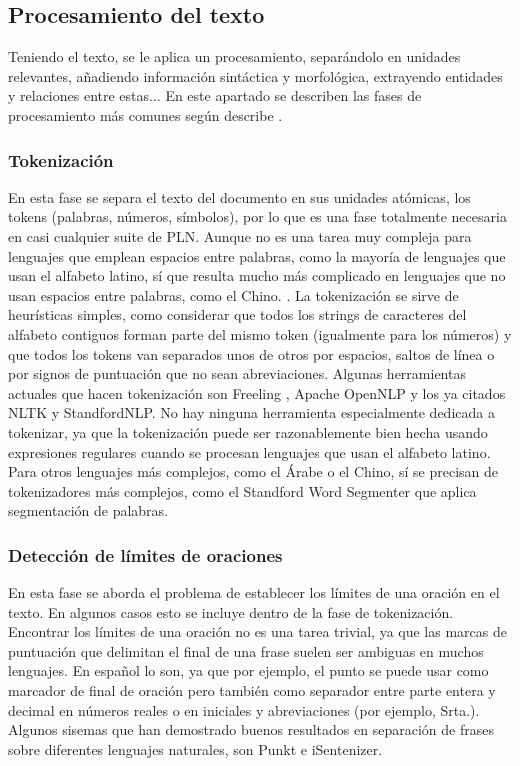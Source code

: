 \subsection{Procesamiento del texto}
Teniendo el texto, se le aplica un procesamiento, separándolo en unidades relevantes, añadiendo información sintáctica y morfológica, extrayendo entidades y relaciones entre estas... En este apartado se describen las fases de procesamiento más comunes según describe \citet{9783319155623}.
\subsubsection{Tokenización}
En esta fase se separa el texto del documento en sus unidades atómicas, los tokens (palabras, números, símbolos), por lo que es una fase totalmente necesaria en casi cualquier suite de PLN. Aunque no es una tarea muy compleja para lenguajes que emplean espacios entre palabras, como la mayoría de lenguajes que usan el alfabeto latino, sí que resulta mucho más complicado en lenguajes que no usan espacios entre palabras, como el Chino. \citet{chang2008optimizing}. \newline
La tokenización se sirve de heurísticas simples, como considerar que todos los strings de caracteres del alfabeto contiguos forman parte del mismo token (igualmente para los números) y que todos los tokens van separados unos de otros por espacios, saltos de línea o por signos de puntuación que no sean abreviaciones. Algunas herramientas actuales que hacen tokenización son \textsf{Freeling} \citet{padro2012freeling}, \textsf{Apache OpenNLP} \citet{baldridge2005opennlp} y los ya citados \textsf{NLTK} y \textsf{StandfordNLP}. No hay ninguna herramienta especialmente dedicada a tokenizar, ya que la tokenización puede ser razonablemente bien hecha usando expresiones regulares cuando se procesan lenguajes que usan el alfabeto latino. Para otros lenguajes más complejos, como el Árabe o el Chino, sí se precisan de tokenizadores más complejos, como el \textsf{Standford Word Segmenter} que aplica segmentación de palabras. 
\subsubsection{Detección de límites de oraciones}
En esta fase se aborda el problema de establecer los límites de una oración en el texto. En algunos casos esto se incluye dentro de la fase de tokenización. Encontrar los límites de una oración no es una tarea trivial, ya que las marcas de puntuación que delimitan el final de una frase suelen ser ambiguas en muchos lenguajes. En español lo son, ya que por ejemplo, el punto se puede usar como marcador de final de oración pero también como separador entre parte entera y decimal en números reales o en iniciales y abreviaciones (por ejemplo, Srta.). \newline
Algunos sisemas que han demostrado buenos resultados en separación de frases sobre diferentes lenguajes naturales, son \textsf{Punkt} \citet{kiss2006unsupervised} e \textsf{iSentenizer}\citet{wong2014isentenizer}.  
